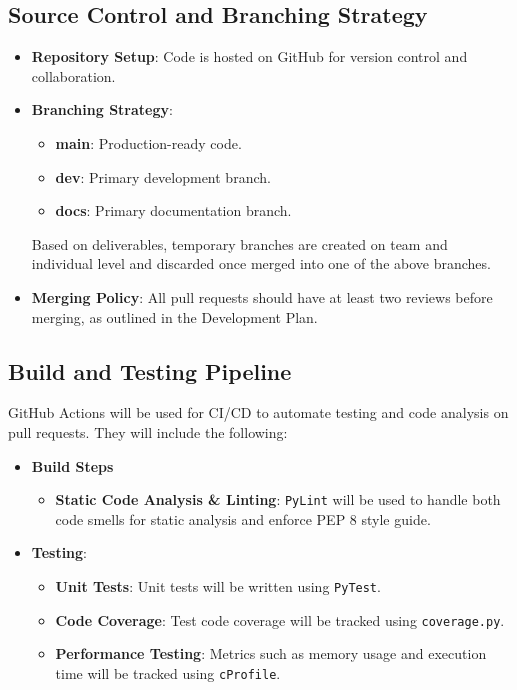 \documentclass{article}
\begin{document}
\subsection{Source Control and Branching Strategy}
\begin{itemize}
    \item \textbf{Repository Setup}: Code is hosted on GitHub for version control and collaboration.
    \item \textbf{Branching Strategy}:
    \begin{itemize}
        \item \textbf{main}: Production-ready code.
        \item \textbf{dev}: Primary development branch.
        \item \textbf{docs}: Primary documentation branch.
    \end{itemize}
    Based on deliverables, temporary branches are created on team and individual level and discarded once merged into one of the above branches.
    \item \textbf{Merging Policy}: All pull requests should have at least two reviews before merging, as outlined in the Development Plan.
\end{itemize}

\subsection{Build and Testing Pipeline}
GitHub Actions will be used for CI/CD to automate testing and code analysis on pull requests. They will include the following:
\begin{itemize}
    \item \textbf{Build Steps}
    \begin{itemize}
        \item \textbf{Static Code Analysis \& Linting}: \texttt{PyLint} will be used to handle both code smells for static analysis and enforce PEP 8 style guide.
    \end{itemize}
    \item \textbf{Testing}:
    \begin{itemize}
        \item \textbf{Unit Tests}: Unit tests will be written using \texttt{PyTest}.
        \item \textbf{Code Coverage}: Test code coverage will be tracked using \texttt{coverage.py}.
        \item \textbf{Performance Testing}: Metrics such as memory usage and execution time will be tracked using \texttt{cProfile}.
    \end{itemize}
\end{itemize}
\end{document}
